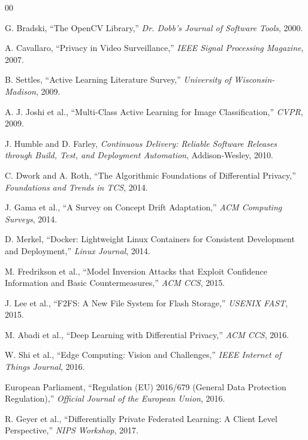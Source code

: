 \documentclass[conference]{IEEEtran}
\begin{document}
\begin{thebibliography}{00}

 G. Bradski, ``The OpenCV Library,'' \textit{Dr. Dobb's Journal of Software Tools}, 2000.

 A. Cavallaro, ``Privacy in Video Surveillance,'' \textit{IEEE Signal Processing Magazine}, 2007.


 B. Settles, ``Active Learning Literature Survey,'' \textit{University of Wisconsin-Madison}, 2009.

 A. J. Joshi et al., ``Multi-Class Active Learning for Image Classification,'' \textit{CVPR}, 2009.

 J. Humble and D. Farley, \textit{Continuous Delivery: Reliable Software Releases through Build, Test, and Deployment Automation}, Addison-Wesley, 2010.

 C. Dwork and A. Roth, ``The Algorithmic Foundations of Differential Privacy,'' \textit{Foundations and Trends in TCS}, 2014.

 J. Gama et al., ``A Survey on Concept Drift Adaptation,'' \textit{ACM Computing Surveys}, 2014.


 D. Merkel, ``Docker: Lightweight Linux Containers for Consistent Development and Deployment,'' \textit{Linux Journal}, 2014.

 M. Fredrikson et al., ``Model Inversion Attacks that Exploit Confidence Information and Basic Countermeasures,'' \textit{ACM CCS}, 2015.

 J. Lee et al., ``F2FS: A New File System for Flash Storage,'' \textit{USENIX FAST}, 2015.


 M. Abadi et al., ``Deep Learning with Differential Privacy,'' \textit{ACM CCS}, 2016.

 W. Shi et al., ``Edge Computing: Vision and Challenges,'' \textit{IEEE Internet of Things Journal}, 2016.

 European Parliament, ``Regulation (EU) 2016/679 (General Data Protection Regulation),'' \textit{Official Journal of the European Union}, 2016.

 R. Geyer et al., ``Differentially Private Federated Learning: A Client Level Perspective,'' \textit{NIPS Workshop}, 2017.


\end{thebibliography}
\end{document}
